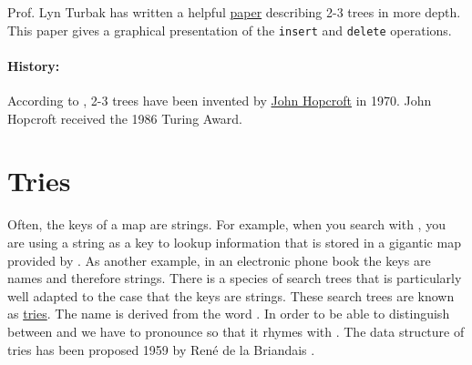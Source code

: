 Prof. Lyn Turbak has written a helpful
\href{http://www.cs.princeton.edu/~dpw/courses/cos326-12/ass/2-3-trees.pdf}{paper} describing 2-3 trees in more
depth.  This paper gives a graphical presentation of the \texttt{insert} and \texttt{delete} operations.

\paragraph{History:}
According to \cite{cormen:09}, 2-3 trees have been invented by
\href{https://en.wikipedia.org/wiki/John_Hopcroft}{John Hopcroft} in 1970.  John Hopcroft received the 1986
Turing Award. 



\section{Tries}
Often, the keys of a map are strings.  For example, when you search with 
\href{https://www.google.com}{}, you are using
a string as a key to lookup information that is stored in a gigantic map provided by .
As another example, in an electronic phone book the keys are names and therefore strings.  
There is a species of search trees that is particularly well adapted to the case that the keys are
strings.  These search trees are known as \href{https://en.wikipedia.org/?title=Trie}{tries}.  
The name is derived from the word
.  In order to be able to distinguish between  and
 we have to pronounce    so that it rhymes with .   The data
structure of tries has been proposed 1959 by Ren\'e de la Briandais \cite{briandais:59}.

